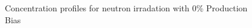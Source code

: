 \documentclass[a4paper]{article}
\begin{document}
      \begin{figure}[h!]  %
        \centering
        \qquad
        \caption{Concentration profiles for neutron irradation with 0\% Production Bias}
        \label{figure:concentrations_neutron_0_1e-6}
      \end{figure}
\end{document}
